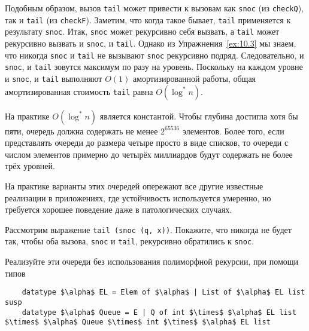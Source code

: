 Подобным образом, вызов \lstinline!tail! может привести к вызовам
как \lstinline!snoc! (из \lstinline!checkQ!), так и \lstinline!tail!
(из \lstinline!checkF!).  Заметим, что когда такое бывает,
\lstinline!tail! применяется к результату \lstinline!snoc!. Итак,
\lstinline!snoc! может рекурсивно себя вызвать, а \lstinline!tail!
может рекурсивно вызвать и \lstinline!snoc!, и
\lstinline!tail!. Однако из Упражнения~\ref{ex:10.3} мы знаем, что
никогда \lstinline!snoc! и \lstinline!tail! не вызывают
\lstinline!snoc! рекурсивно подряд. Следовательно, и \lstinline!snoc!,
и \lstinline!tail! зовутся максимум по разу на уровень.  Поскольку на
каждом уровне и \lstinline!snoc!, и \lstinline!tail! выполняют $O(1)$
амортизированной работы, общая амортизированная стоимость
\lstinline!tail! равна $O(\log^* n)$.

\begin{remark}
  На практике $O(\log^* n)$ является константой. Чтобы глубина
  достигла хотя бы пяти, очередь должна содержать не менее $2^{65536}$
  элементов. Более того, если представлять очереди до размера четыре
  просто в виде списков, то очереди с числом элементов примерно до четырёх
  миллиардов будут содержать не более трёх уровней.
\end{remark}

\begin{hint}
  На практике варианты этих очередей опережают все другие известные
  реализации в приложениях, где устойчивость используется умеренно,
  но требуется хорошее поведение даже в патологических случаях.
\end{hint}

\begin{exercise}\label{ex:10.3}
  Рассмотрим выражение \lstinline!tail (snoc (q, x))!. Покажите, что
  никогда не будет так, чтобы оба вызова, \lstinline!snoc! и
  \lstinline!tail!, рекурсивно обратились к \lstinline!snoc!.
\end{exercise}

\begin{exercise}\label{ex:10.4}
  Реализуйте эти очереди без использования полиморфной рекурсии, при
  помощи типов
  \begin{lstlisting}
    datatype $\alpha$ EL = Elem of $\alpha$ | List of $\alpha$ EL list susp
    datatype $\alpha$ Queue = E | Q of int $\times$ $\alpha$ EL list $\times$ $\alpha$ Queue $\times$ int $\times$ $\alpha$ EL list
  \end{lstlisting}
\end{exercise}

